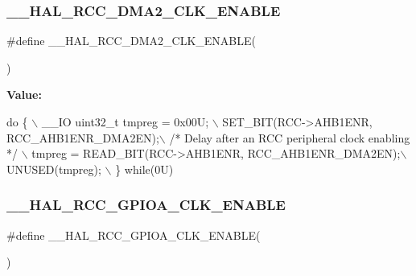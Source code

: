 \subsubsection{\texorpdfstring{\+\_\+\+\_\+\+H\+A\+L\+\_\+\+R\+C\+C\+\_\+\+D\+M\+A2\+\_\+\+C\+L\+K\+\_\+\+E\+N\+A\+B\+LE}{\_\_HAL\_RCC\_DMA2\_CLK\_ENABLE}}
{\footnotesize\ttfamily \#define \+\_\+\+\_\+\+H\+A\+L\+\_\+\+R\+C\+C\+\_\+\+D\+M\+A2\+\_\+\+C\+L\+K\+\_\+\+E\+N\+A\+B\+LE(\begin{DoxyParamCaption}{ }\end{DoxyParamCaption})}

{\bfseries Value\+:}
\begin{DoxyCode}
\textcolor{keywordflow}{do} \{ \(\backslash\)
                                        \_\_IO uint32\_t tmpreg = 0x00U; \(\backslash\)
                                        SET\_BIT(RCC->AHB1ENR, RCC\_AHB1ENR\_DMA2EN);\(\backslash\)
                                        \textcolor{comment}{/* Delay after an RCC peripheral clock enabling */} \(\backslash\)
                                        tmpreg = READ\_BIT(RCC->AHB1ENR, RCC\_AHB1ENR\_DMA2EN);\(\backslash\)
                                        UNUSED(tmpreg); \(\backslash\)
                                          \} \textcolor{keywordflow}{while}(0U)
\end{DoxyCode}
\mbox{\label{group___r_c_c___a_h_b1___clock___enable___disable_ga1fde58d775fd2458002df817a68f486e}} 
\subsubsection{\texorpdfstring{\+\_\+\+\_\+\+H\+A\+L\+\_\+\+R\+C\+C\+\_\+\+G\+P\+I\+O\+A\+\_\+\+C\+L\+K\+\_\+\+E\+N\+A\+B\+LE}{\_\_HAL\_RCC\_GPIOA\_CLK\_ENABLE}}
{\footnotesize\ttfamily \#define \+\_\+\+\_\+\+H\+A\+L\+\_\+\+R\+C\+C\+\_\+\+G\+P\+I\+O\+A\+\_\+\+C\+L\+K\+\_\+\+E\+N\+A\+B\+LE(\begin{DoxyParamCaption}{ }\end{DoxyParamCaption})}

